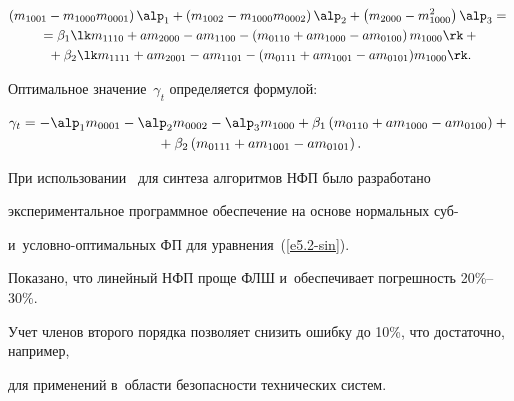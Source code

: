 \vspace*{-12pt}





\noindent


 \begin{multline*}


 \left(m_{1001}-m_{1000}m_{0001}\right)\alp_1+


 \left(m_{1002}-m_{1000}m_{0002}\right)\alp_2 +


 \left(m_{2000}-m_{1000}^2\right)\alp_3={}\\


{}= \beta_1\lk m_{1110}+am_{2000}-am_{1100}-\left(m_{0110}+am_{1000}-am_{0100}\right)m_{1000}\rk+{}\\


{}+ \beta_2\lk m_{1111}+am_{2001}-am_{1101}-(m_{0111}+am_{1001}-am_{0101})m_{1000}\rk.




\end{multline*}


Оптимальное значение~$\gamma_t$ определяется формулой:


 \begin{multline*} 


 \gamma_t=-\alp_1m_{0001}-\alp_2m_{0002}-\alp_3m_{1000}+\beta_1 


 \left(m_{0110}+am_{1000}-am_{0100}\right)+{}\\


{}+ \beta_2 \left(m_{0111}+am_{1001}-am_{0101}\right).




\end{multline*}





При использовании~\cite{6-sin} для синтеза алгоритмов НФП было разработано 


экспериментальное программное обеспечение на основе нормальных суб- 


и~услов\-но-оп\-ти\-маль\-ных ФП для уравнения~(\ref{e5.2-sin}). 


Показано, что линейный НФП проще ФЛШ и~обеспечивает погрешность 20\%--30\%. 


Учет членов второго порядка позволяет снизить ошибку до 10\%, что достаточно, например, 


для применений в~области безопасности технических систем.





